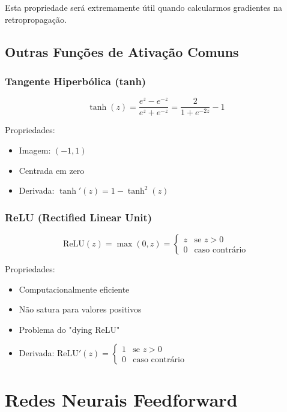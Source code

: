 \documentclass[a4paper,12pt]{article}
\begin{document}
Esta propriedade será extremamente útil quando calcularmos gradientes na retropropagação.

\subsection{Outras Funções de Ativação Comuns}

\subsubsection{Tangente Hiperbólica (tanh)}
\begin{equation}
    \tanh(z) = \frac{e^z - e^{-z}}{e^z + e^{-z}} = \frac{2}{1 + e^{-2z}} - 1
\end{equation}

Propriedades:
\begin{itemize}
    \item Imagem: $(-1, 1)$
    \item Centrada em zero
    \item Derivada: $\tanh'(z) = 1 - \tanh^2(z)$
\end{itemize}

\subsubsection{ReLU (Rectified Linear Unit)}
\begin{equation}
    \text{ReLU}(z) = \max(0, z) = \begin{cases}
        z & \text{se } z > 0 \\
        0 & \text{caso contrário}
    \end{cases}
\end{equation}

Propriedades:
\begin{itemize}
    \item Computacionalmente eficiente
    \item Não satura para valores positivos
    \item Problema do "dying ReLU"
    \item Derivada: $\text{ReLU}'(z) = \begin{cases} 1 & \text{se } z > 0 \\ 0 & \text{caso contrário} \end{cases}$
\end{itemize}

\section{Redes Neurais Feedforward}
\end{document}
